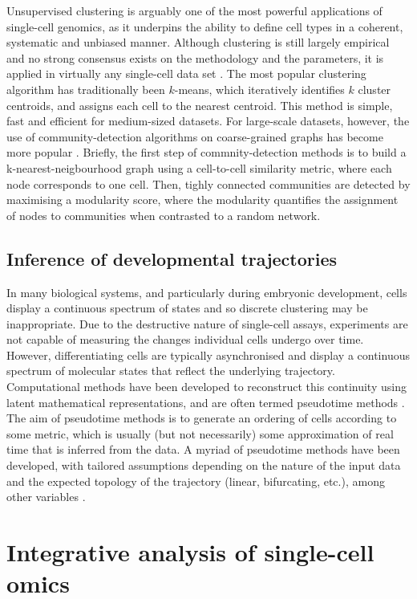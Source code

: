Unsupervised clustering is arguably one of the most powerful applications of single-cell genomics, as it underpins the ability to define cell types in a coherent, systematic and unbiased manner. Although clustering is still largely empirical and no strong consensus exists on the methodology and the parameters, it is applied in virtually any single-cell data set \cite{Kiselev2019}. The most popular clustering algorithm has traditionally been $k$-means, which iteratively identifies $k$ cluster centroids, and assigns each cell to the nearest centroid. This method is simple, fast and efficient for medium-sized datasets. For large-scale datasets, however, the use of community-detection algorithms on coarse-grained graphs has become more popular \cite{Luecken2019}. Briefly, the first step of commnity-detection methods is to build a k-nearest-neigbourhood graph using a cell-to-cell similarity metric, where each node corresponds to one cell. Then, tighly connected communities are detected by maximising a modularity score, where the modularity quantifies the assignment of nodes to communities when contrasted to a random network.

\subsection{Inference of developmental trajectories}

In many biological systems, and particularly during embryonic development, cells display a continuous spectrum of states and so discrete clustering may be inappropriate. Due to the destructive nature of single-cell assays, experiments are not capable of measuring the changes individual cells undergo over time. However, differentiating cells are typically asynchronised and display a continuous spectrum of molecular states that reflect the underlying trajectory. Computational methods have been developed to reconstruct this continuity using latent mathematical representations, and are often termed pseudotime methods \cite{Saelens2019}. The aim of pseudotime methods is to generate an ordering of cells according to some metric, which is usually (but not necessarily) some approximation of real time that is inferred from the data. A myriad of pseudotime methods have been developed, with tailored assumptions depending on the nature of the input data and the expected topology of the trajectory (linear, bifurcating, etc.), among other variables \cite{Saelens2019}. 

\section{Integrative analysis of single-cell omics}

